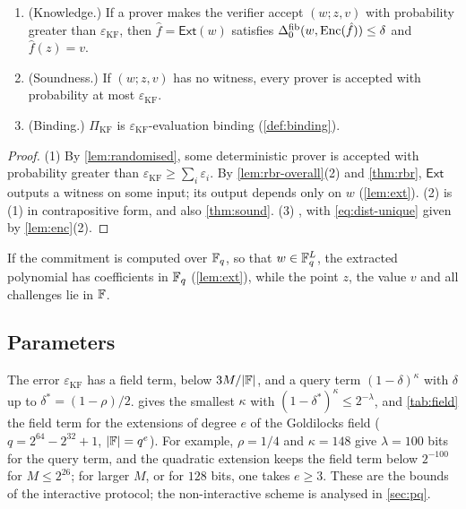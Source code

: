 \begin{corollary}\label{cor:sound}
\begin{enumerate}
  \item (Knowledge.) If a prover makes the verifier accept $(w;z,v)$ with probability greater than $\varepsilon_{\mathrm{KF}}$, then $\hat f = \mathsf{Ext}(w)$ satisfies $\Delta^{\mathrm{fib}}_0(w, \mathrm{Enc}(\hat f)) \le \delta$ and $\hat f(z) = v$.
  \item (Soundness.) If $(w;z,v)$ has no witness, every prover is accepted with probability at most $\varepsilon_{\mathrm{KF}}$.
  \item (Binding.) $\Pi_{\mathrm{KF}}$ is $\varepsilon_{\mathrm{KF}}$-evaluation binding (\cref{def:binding}).
\end{enumerate}
\end{corollary}

\begin{proof}
(1) By \cref{lem:randomised}, some deterministic prover is accepted with probability greater than $\varepsilon_{\mathrm{KF}} \ge \sum_i \varepsilon_i$. By \cref{lem:rbr-overall}(2) and \cref{thm:rbr}, $\mathsf{Ext}$ outputs a witness on some input; its output depends only on $w$ (\cref{lem:ext}).
(2) is (1) in contrapositive form, and also \cref{thm:sound}.
(3) , with \eqref{eq:dist-unique} given by \cref{lem:enc}(2).
\end{proof}

\begin{remark}\label{rem:base}
If the commitment is computed over $\mathbb{F}_q$, so that $w \in \mathbb{F}_q^L$, the extracted polynomial has coefficients in $\mathbb{F}_q$ (\cref{lem:ext}), while the point $z$, the value $v$ and all challenges lie in $\mathbb{F}$.
\end{remark}

\subsection{Parameters}\label{sec:sound:params}

The error $\varepsilon_{\mathrm{KF}}$ has a field term, below $3M/|\mathbb{F}|$, and a query term $(1-\delta)^\kappa$ with $\delta$ up to $\delta^* = (1-\rho)/2$.
 gives the smallest $\kappa$ with $(1-\delta^*)^\kappa \le 2^{-\lambda}$, and \cref{tab:field} the field term for the extensions of degree $e$ of the Goldilocks field ($q = 2^{64}-2^{32}+1$, $|\mathbb{F}| = q^e$).
For example, $\rho = 1/4$ and $\kappa = 148$ give $\lambda = 100$ bits for the query term, and the quadratic extension keeps the field term below $2^{-100}$ for $M \le 2^{26}$; for larger $M$, or for $128$ bits, one takes $e \ge 3$.
These are the bounds of the interactive protocol; the non-interactive scheme is analysed in \cref{sec:pq}.

